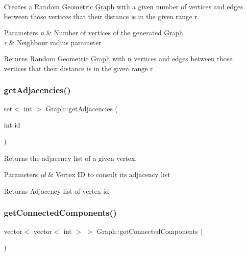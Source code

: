 Creates a Random Geometric \hyperlink{classGraph}{Graph} with a given number of vertices and edges between those vertices that their distance is in the given range \textquotesingle{}r\textquotesingle{}. 


\begin{DoxyParams}{Parameters}
{\em n} & Number of vertices of the generated \hyperlink{classGraph}{Graph} \\
\hline
{\em r} & Neighbour radius parameter \\
\hline
\end{DoxyParams}
\begin{DoxyReturn}{Returns}
Random Geometric \hyperlink{classGraph}{Graph} with n vertices and edges between those vertices that their distance is in the given range \textquotesingle{}r\textquotesingle{} 
\end{DoxyReturn}
\mbox{\label{classGraph_abe4de4c0e093b910c8bdfe6dd2073fd3}} 
\subsubsection{\texorpdfstring{get\+Adjacencies()}{getAdjacencies()}}
{\footnotesize\ttfamily set$<$ int $>$ Graph\+::get\+Adjacencies (\begin{DoxyParamCaption}\item[{int}]{id }\end{DoxyParamCaption})}



Returns the adjacency list of a given vertex. 


\begin{DoxyParams}{Parameters}
{\em id} & Vertex ID to consult its adjacency list \\
\hline
\end{DoxyParams}
\begin{DoxyReturn}{Returns}
Adjacency list of vertex \textquotesingle{}id\textquotesingle{} 
\end{DoxyReturn}
\mbox{\label{classGraph_aa2609fca5b449849d67ed7a20bf05107}} 
\subsubsection{\texorpdfstring{get\+Connected\+Components()}{getConnectedComponents()}}
{\footnotesize\ttfamily vector$<$ vector$<$ int $>$ $>$ Graph\+::get\+Connected\+Components (\begin{DoxyParamCaption}{ }\end{DoxyParamCaption})}



